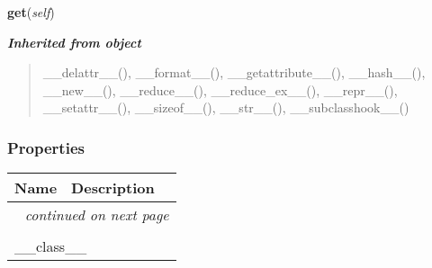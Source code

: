 \hspace{.8\funcindent}\begin{boxedminipage}{\funcwidth}

    \raggedright \textbf{get}(\textit{self})

\setlength{\parskip}{2ex}
\setlength{\parskip}{1ex}
    \end{boxedminipage}


\large{\textbf{\textit{Inherited from object}}}

\begin{quote}
\_\_delattr\_\_(), \_\_format\_\_(), \_\_getattribute\_\_(), \_\_hash\_\_(), \_\_new\_\_(), \_\_reduce\_\_(), \_\_reduce\_ex\_\_(), \_\_repr\_\_(), \_\_setattr\_\_(), \_\_sizeof\_\_(), \_\_str\_\_(), \_\_subclasshook\_\_()
\end{quote}


  \subsubsection{Properties}

    \vspace{-1cm}
\hspace{\varindent}\begin{longtable}{|p{\varnamewidth}|p{\vardescrwidth}|l}
\cline{1-2}
\cline{1-2} \centering \textbf{Name} & \centering \textbf{Description}& \\
\cline{1-2}
\endhead\cline{1-2}\multicolumn{3}{r}{\small\textit{continued on next page}}\\\endfoot\cline{1-2}
\endlastfoot\multicolumn{2}{|l|}{\textit{Inherited from object}}\\
\multicolumn{2}{|p{\varwidth}|}{\raggedright \_\_class\_\_}\\
\cline{1-2}
\end{longtable}



